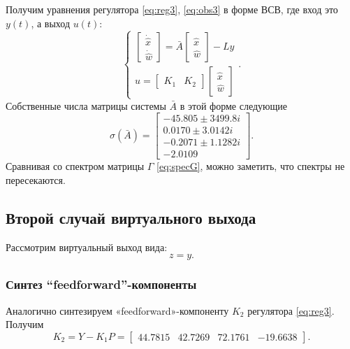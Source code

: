 Получим уравнения регулятора \eqref{eq:reg3}, \eqref{eq:obs3} в форме ВСВ,
где вход это $y(t)$, а выход $u(t)$:
\begin{equation*}
    \begin{cases}
        \begin{bmatrix}
            \dot{\hat x}\\
            \dot{\hat w}
        \end{bmatrix}=
        \bar A\begin{bmatrix}
            \hat x\\
            \hat w
        \end{bmatrix}-Ly\\
        u=\begin{bmatrix}
            K_1&K_2
        \end{bmatrix}\begin{bmatrix}
            \hat x\\
            \hat w
        \end{bmatrix}
    \end{cases}.
\end{equation*}
Собственные числа матрицы системы $\bar A$ в этой форме следующие
\begin{equation*}
    \sigma(\bar A)=\begin{bmatrix}
            -45.805 \pm 3499.8i \\
            0.0170 \pm 3.0142i \\
            -0.2071 \pm 1.1282i \\
            -2.0109 
    \end{bmatrix}.
\end{equation*}
Сравнивая со спектром матрицы $\Gamma$ \eqref{eq:specG}, можно заметить, что
спектры не пересекаются.






\subsection{Второй случай виртуального выхода}
Рассмотрим виртуальный выход вида:
\begin{equation*}
    z=y.
\end{equation*}

\subsubsection{Синтез ``feedforward''-компоненты}
Аналогично синтезируем «feedforward»-компоненту $K_2$ регулятора \eqref{eq:reg3}.
Получим
\begin{equation*}
    K_2=Y-K_1P=\begin{bmatrix}
        44.7815&	42.7269&	72.1761	&-19.6638
    \end{bmatrix}.
\end{equation*}

